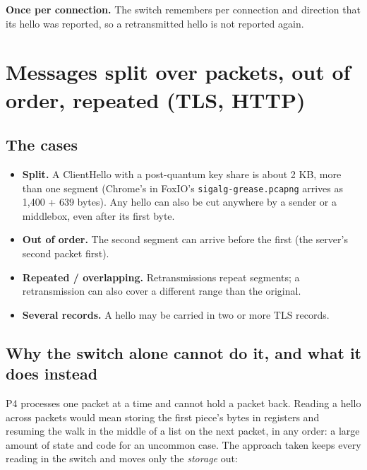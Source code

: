 \documentclass[11pt,a4paper]{article}
\newcommand{\code}[1]{\texttt{#1}}
\begin{document}
\textbf{Once per connection.} The switch remembers per connection and direction that its hello was reported, so a
retransmitted hello is not reported again.

\section{Messages split over packets, out of order, repeated (TLS, HTTP)}
\label{sec:split}

\subsection{The cases}

\begin{itemize}
\item \textbf{Split.} A ClientHello with a post-quantum key share is about 2 KB, more than one segment (Chrome's in
  FoxIO's \code{sigalg-grease.pcapng} arrives as 1,400 + 639 bytes). Any hello can also be cut anywhere by a sender
  or a middlebox, even after its first byte.
\item \textbf{Out of order.} The second segment can arrive before the first (the server's second packet first).
\item \textbf{Repeated / overlapping.} Retransmissions repeat segments; a retransmission can also cover a different
  range than the original.
\item \textbf{Several records.} A hello may be carried in two or more TLS records.
\end{itemize}

\subsection{Why the switch alone cannot do it, and what it does instead}

P4 processes one packet at a time and cannot hold a packet back. Reading a hello across packets would mean storing
the first piece's bytes in registers and resuming the walk in the middle of a list on the next packet, in any
order: a large amount of state and code for an uncommon case. The approach taken keeps every reading in the switch
and moves only the \emph{storage} out:
\end{document}
